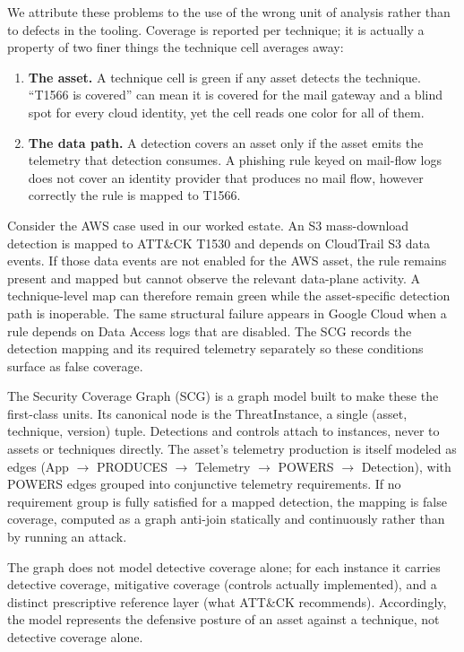 \documentclass[10pt]{article}
\newcommand{\SCG}{Security Coverage Graph (SCG)}
\begin{document}
We attribute these problems to the use of the wrong unit of analysis rather than to defects in the tooling. Coverage is reported per technique; it is actually a property of two finer things the technique cell averages away:
\begin{enumerate}
\item \textbf{The asset.} A technique cell is green if any asset detects the technique. ``T1566 is covered'' can mean it is covered for the mail gateway and a blind spot for every cloud identity, yet the cell reads one color for all of them.
\item \textbf{The data path.} A detection covers an asset only if the asset emits the telemetry that detection consumes. A phishing rule keyed on mail-flow logs does not cover an identity provider that produces no mail flow, however correctly the rule is mapped to T1566.
\end{enumerate}

Consider the AWS case used in our worked estate. An S3 mass-download detection is mapped to ATT\&CK T1530 and depends on CloudTrail S3 data events. If those data events are not enabled for the AWS asset, the rule remains present and mapped but cannot observe the relevant data-plane activity. A technique-level map can therefore remain green while the asset-specific detection path is inoperable. The same structural failure appears in Google Cloud when a rule depends on Data Access logs that are disabled. The SCG records the detection mapping and its required telemetry separately so these conditions surface as false coverage.

The \SCG{} is a graph model built to make these the first-class units. Its canonical node is the ThreatInstance, a single (asset, technique, version) tuple. Detections and controls attach to instances, never to assets or techniques directly. The asset's telemetry production is itself modeled as edges (App $\rightarrow$ PRODUCES $\rightarrow$ Telemetry $\rightarrow$ POWERS $\rightarrow$ Detection), with POWERS edges grouped into conjunctive telemetry requirements. If no requirement group is fully satisfied for a mapped detection, the mapping is false coverage, computed as a graph anti-join statically and continuously rather than by running an attack.

The graph does not model detective coverage alone; for each instance it carries detective coverage, mitigative coverage (controls actually implemented), and a distinct prescriptive reference layer (what ATT\&CK recommends). Accordingly, the model represents the defensive posture of an asset against a technique, not detective coverage alone.
\end{document}
